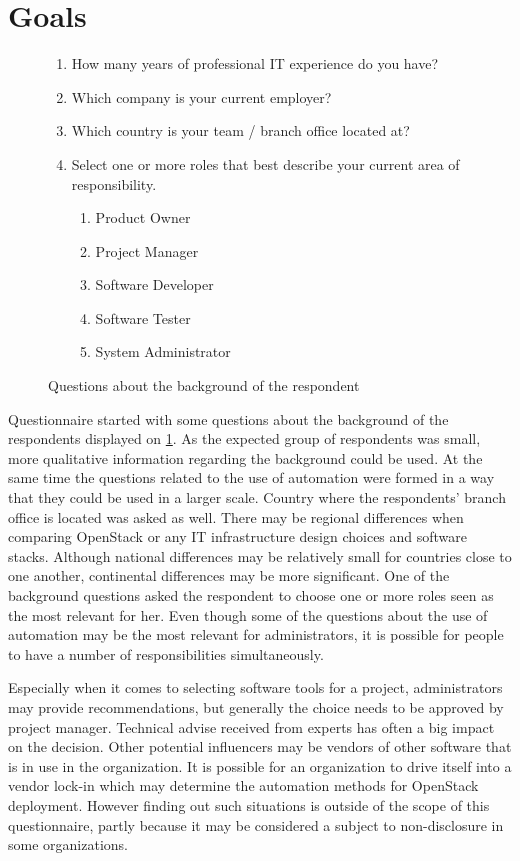 \section{Goals}

\begin{figure}[t]
\centering
\begin{enumerate}
  \itemsep0em
  \item How many years of professional IT experience do you have?
  \item Which company is your current employer?
  \item Which country is your team / branch office located at?
  \item Select one or more roles that best describe your current area of
        responsibility.
  \begin{enumerate}
    \itemsep0em
    \item Product Owner
    \item Project Manager
    \item Software Developer
    \item Software Tester
    \item System Administrator
  \end{enumerate}
\end{enumerate}
\caption{Questions about the background of the respondent}
\label{fig:questionnaire-background}
\end{figure}

Questionnaire started with some questions about the background of the
respondents displayed on \ref{fig:questionnaire-background}. As the
expected group of respondents was small, more qualitative information regarding
the background could be used. At the same time the questions related to the use
of automation were formed in a way that they could be used in a larger scale.
Country where the respondents' branch office is located was asked as well.
There may be regional differences when comparing OpenStack or any IT
infrastructure design choices and software stacks. Although national
differences may be relatively small for countries close to one another,
continental differences may be more significant. One of the background
questions asked the respondent to choose one or more roles seen as the most
relevant for her. Even though some of the questions about the use of automation
may be the most relevant for administrators, it is possible for people to have
a number of responsibilities simultaneously.

Especially when it comes to selecting software tools for a project,
administrators may provide recommendations, but generally the choice needs to
be approved by project manager. Technical advise received from experts has
often a big impact on the decision. Other potential influencers may be vendors
of other software that is in use in the organization. It is possible for an
organization to drive itself into a vendor lock-in which may determine the
automation methods for OpenStack deployment. However finding out such
situations is outside of the scope of this questionnaire, partly because it may
be considered a subject to non-disclosure in some organizations.

